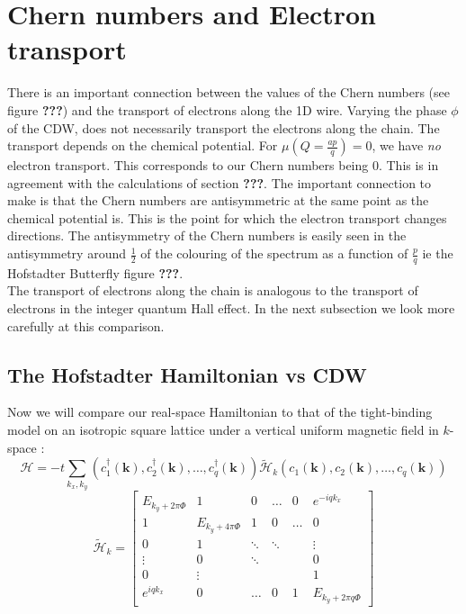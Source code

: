 \documentclass[letterpaper, 10 pt, conference]{ieeeconf}  %
\begin{document}
\section{Chern numbers and Electron transport}
There is an important connection between the values of the Chern numbers (see figure \textbf{???})
and the transport of electrons along the 1D wire.
Varying the phase $\phi$ of the CDW, does not necessarily transport the electrons along the chain.
The transport depends on the chemical potential.
For $\mu(Q=\frac{ap}{q}) = 0$, we have \textit{no} electron transport.
This corresponds to our Chern numbers being $0$.
This is in agreement with the calculations of section \textbf{???}.
The important connection to make is that the Chern numbers are antisymmetric at the same point as the chemical potential is.
This is the point for which the electron transport changes directions.
The antisymmetry of the Chern numbers is easily seen in the antisymmetry around $\frac{1}{2}$ of the colouring of the spectrum as a function of $\frac{p}{q}$ ie the Hofstadter Butterfly figure \textbf{???}.\\
The transport of electrons along the chain is analogous to the transport of electrons in the integer quantum Hall effect.
In the next subsection we look more carefully at this comparison.

\subsection{The Hofstadter Hamiltonian vs CDW}
Now we will compare our real-space Hamiltonian to that of the tight-binding model on an
isotropic square lattice under a vertical uniform magnetic field in $k$-space \cite{
Distribution of Chern number by Landau level
broadening in Hofstadter butterfly}:
$$
\mathcal{H}=-t\sum_{k_{x},k_{y}}(c_{1}^{\dagger}(\textbf{k}),c_{2}^{\dagger}(\textbf{k}),\dots,c_{q}^{\dagger}(\textbf{k}))\tilde{\mathcal{H}}_{k}(c_{1}(\textbf{k}),c_{2}(\textbf{k}),\dots,c_{q}(\textbf{k}))
$$
$$
\tilde{\mathcal{H}}_{k}=\begin{bmatrix}
E_{k_{y}+2\pi \Phi}      & 1     & 0      & \hdots     & 0     & e^{-iqk_{x}}  \\
1    &E_{k_{y}+4\pi \Phi} & 1 & 0 & \hdots     & 0 \\
0               & 1 & \ddots & \ddots  &  &\vdots \\
\vdots   & 0 & \ddots &  &  &  0  \\
0 &  \vdots    &  &  &  & 1 \\
e^{iqk_{x}} & 0 &    \hdots          &0   & 1      & E_{k_{y}+2\pi q\Phi}
\end{bmatrix}
$$
\end{document}

